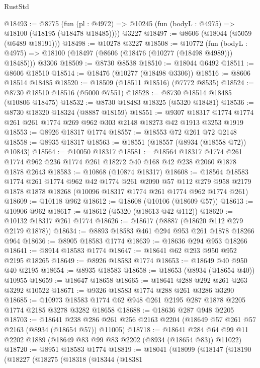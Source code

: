 \begin{lexlean}{RustStd}
\begin{coremodule}
@18493 := @8775
    (fun (pl : @4972) => @10245 (fun (bodyL : @4975) => @18100 (@18195 (@18478 @18485))))
    @3227
@18497 := @8606 (@18044 (@5059 (@6489 @18191)))
@18498 := @10278 @3227
@18508 := @10772
    (fun (bodyL : @4975) => @18100 (@18497 (@8606 (@18476 (@10277 (@18498 @4989))) @18485)))
    @3306
@18509 := @8730 @8538
@18510 := @18044 @6492
@18511 := @8606 @18510
@18514 := @18476 (@10277 (@18498 @3306))
@18516 := @8606 @18514 @18485
@18520 := @18509 (@18511 @18516) (@7772 @8535)
@18524 := @8730 @18510 @18516 (@5000 @7551)
@18528 := @8730 @18514 @18485 (@10806 @18475)
@18532 := @8730 @18483 @18325 (@5320 @18481)
@18536 := @8730 @18320 @18324 (@8887 @18159)
@18551 := @9307 @18317 @1774 @1774 @261 @261 @1774 @269 @962 @303 @2148 @18273 @42 @1913 @3253 @1919
@18553 := @8926 @18317 @1774
@18557 := @18553 @72 @261 @72 @2148
@18558 := @8935 @18317
@18563 := @18551 (@18557 (@8934 (@18558 @72)) @10843)
@18564 := @10050 @18317
@18581 := @18564
    @18317
    @1774
    @261
    @1774
    @962
    @236
    @1774
    @261
    @18272
    @40
    @168
    @42
    @238
    @2060
    @1878
    @1878
    @2643
@18583 := @10868 (@10874 @18317)
@18608 := @18564
    @18583
    @1774
    @261
    @1774
    @962
    @42
    @1774
    @261
    @2090
    @57
    @112
    @279
    @958
    @2179
    @1878
    @1878
    @18268
    (@10096 @18317 @1774 @261 @1774 @962 @1774 @261)
@18609 := @10118 @962
@18612 := @18608 (@10106 (@18609 @57))
@18613 := @10906 @962
@18617 := @18612 (@5320 (@18613 @42 @112))
@18620 := @10132 @18317 @261 @1774
@18626 := @18617 (@8887 (@18620 @112 @279 @2179 @1878))
@18634 := @8893 @18583 @461 @294 @953 @261 @1878 @18266 @964
@18636 := @8905 @18583 @1774
@18639 := @18636 @294 @953 @18266
@18641 := @8914 @18583 @1774
@18647 := @18641 @62 @293 @950 @952 @2195 @18265
@18649 := @8926 @18583 @1774
@18653 := @18649 @40 @950 @40 @2195
@18654 := @8935 @18583
@18658 := @18653 (@8934 (@18654 @40)) @10955
@18659 := @18647 @18658
@18665 := @18641 @288 @292 @261 @263 @3292 @10522
@18671 := @9326 @18583 @1774 @288 @261 @3286 @3290
@18685 := @10973 @18583 @1774 @62 @948 @261 @2195 @287 @1878 @2205 @1774 @2185 @3278 @3282 @18658
@18688 := @18636 @287 @948 @2205
@18703 := @18641
    @238
    @286
    @261
    @256
    @2163
    @2204
    (@18649 @57 @261 @57 @2163 (@8934 (@18654 @57)) @11005)
@18718 := @18641 @284 @64 @99 @11 @2202 @1889 (@18649 @83 @99 @83 @2202 (@8934 (@18654 @83)) @11022)
@18720 := @8951 @18583 @1774
@18819 := @18041
    (@18099
      (@18147
        (@18190
          (@18227
            (@18275
              (@18318
                (@18344
                  (@18381

\end{coremodule}
\end{lexlean}
